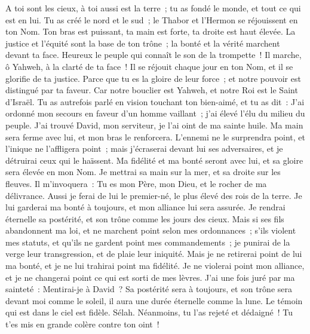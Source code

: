 \begin{multicols}{2}
A toi sont les cieux, à toi aussi est la terre~; tu as fondé le monde, et tout ce qui est en lui.
Tu as créé le nord et le sud~; le Thabor et l'Hermon se réjouissent en ton Nom.
Ton bras est puissant, ta main est forte, ta droite est haut élevée.
La justice et l'équité sont la base de ton trône~; la bonté et la vérité marchent devant ta face.
Heureux le peuple qui connaît le son de la trompette~! Il marche, ô Yahweh, à la clarté de ta face~!
Il se réjouit chaque jour en ton Nom, et il se glorifie de ta justice.
Parce que tu es la gloire de leur force~; et notre pouvoir est distingué par ta faveur.
Car notre bouclier est Yahweh, et notre Roi est le Saint d'Israël.
Tu as autrefois parlé en vision touchant ton bien-aimé, et tu as dit~: J'ai ordonné mon secours en faveur d'un homme vaillant~; j'ai élevé l'élu du milieu du peuple.
J'ai trouvé David, mon serviteur, je l'ai oint de ma sainte huile.
Ma main sera ferme avec lui, et mon bras le renforcera.
L'ennemi ne le surprendra point, et l'inique ne l'affligera point~;
mais j'écraserai devant lui ses adversaires, et je détruirai ceux qui le haïssent.
Ma fidélité et ma bonté seront avec lui, et sa gloire sera élevée en mon Nom.
Je mettrai sa main sur la mer, et sa droite sur les fleuves.
Il m'invoquera~: Tu es mon Père, mon Dieu, et le rocher de ma délivrance.
Aussi je ferai de lui le premier-né, le plus élevé des rois de la terre.
Je lui garderai ma bonté à toujours, et mon alliance lui sera assurée.
Je rendrai éternelle sa postérité, et son trône comme les jours des cieux.
Mais si ses fils abandonnent ma loi, et ne marchent point selon mes ordonnances~;
s'ils violent mes statuts, et qu'ils ne gardent point mes commandements~;
je punirai de la verge leur transgression, et de plaie leur iniquité.
Mais je ne retirerai point de lui ma bonté, et je ne lui trahirai point ma fidélité.
Je ne violerai point mon alliance, et je ne changerai point ce qui est sorti de mes lèvres.
J'ai une fois juré par ma sainteté~: Mentirai-je à David~?
Sa postérité sera à toujours, et son trône sera devant moi comme le soleil,
il aura une durée éternelle comme la lune. Le témoin qui est dans le ciel est fidèle. Sélah.
Néanmoins, tu l'as rejeté et dédaigné~! Tu t'es mis en grande colère contre ton oint~!

\end{multicols}
